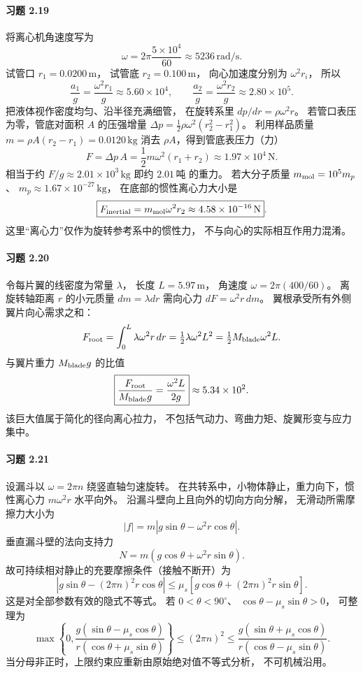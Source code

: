\paragraph{习题 2.19}
将离心机角速度写为
\[
 \omega=2\pi\frac{5\times10^4}{60}
 \approx5236\,\mathrm{rad/s}.
\]
试管口 \(r_1=0.0200\,\mathrm m\)，
试管底 \(r_2=0.100\,\mathrm m\)，
向心加速度分别为 \(\omega^2r_i\)，
所以
\[
 \frac{a_1}{g}=\frac{\omega^2r_1}{g}
 \approx5.60\times10^4,\qquad
 \frac{a_2}{g}=\frac{\omega^2r_2}{g}
 \approx2.80\times10^5.
\]
把液体视作密度均匀、沿半径充满细管，
在旋转系里 \(dp/dr=\rho\omega^2r\)。
若管口表压为零，管底对面积 \(A\) 的压强增量
\(\Delta p=\frac12\rho\omega^2(r_2^2-r_1^2)\)。
利用样品质量
\(m=\rho A(r_2-r_1)=0.0120\,\mathrm{kg}\) 消去
\(\rho A\)，得到管底表压力（力）
\[
 \boxed{F=\Delta p\,A
 =\frac12m\omega^2(r_1+r_2)}
 \approx1.97\times10^4\,\mathrm N.
\]
相当于约 \(F/g\approx2.01\times10^3\,\mathrm{kg}\)
即约 \(\boxed{2.01\,\text{吨}}\) 的重力。
若大分子质量
\(m_{\rm mol}=10^5m_p\)、
\(m_p\approx1.67\times10^{-27}\,\mathrm{kg}\)，
在底部的惯性离心力大小是
\[
 \boxed{F_{\rm inertial}
 =m_{\rm mol}\omega^2r_2
 \approx4.58\times10^{-16}\,\mathrm N}.
\]
这里“离心力”仅作为旋转参考系中的惯性力，
不与向心的实际相互作用力混淆。

\paragraph{习题 2.20}
令每片翼的线密度为常量 \(\lambda\)，
长度 \(L=5.97\,\mathrm m\)，
角速度 \(\omega=2\pi(400/60)\)。
离旋转轴距离 \(r\) 的小元质量
\(dm=\lambda dr\) 需向心力
\(dF=\omega^2r\,dm\)。
翼根承受所有外侧翼片向心需求之和：
\[
 F_{\rm root}
 =\int_0^L\lambda\omega^2r\,dr
 =\tfrac12\lambda\omega^2L^2
 =\tfrac12M_{\rm blade}\omega^2L.
\]
与翼片重力 \(M_{\rm blade}g\) 的比值
\[
 \boxed{\frac{F_{\rm root}}{M_{\rm blade}g}
 =\frac{\omega^2L}{2g}}
 \approx5.34\times10^2.
\]
该巨大值属于简化的径向离心拉力，
不包括气动力、弯曲力矩、旋翼形变与应力集中。

\paragraph{习题 2.21}
设漏斗以 \(\omega=2\pi n\) 绕竖直轴匀速旋转。
在共转系中，小物体静止，重力向下，惯性离心力
\(m\omega^2r\) 水平向外。
沿漏斗壁向上且向外的切向方向分解，
无滑动所需摩擦力大小为
\[
 |f|=m|g\sin\theta-\omega^2r\cos\theta|.
\]
垂直漏斗壁的法向支持力
\[
 N=m(g\cos\theta+\omega^2r\sin\theta).
\]
故可持续相对静止的充要摩擦条件（接触不断开）为
\[
 \boxed{|g\sin\theta-(2\pi n)^2r\cos\theta|
 \le\mu_s[g\cos\theta+(2\pi n)^2r\sin\theta]}.
\]
这是对全部参数有效的隐式不等式。
若 \(0<\theta<90^\circ\)、
\(\cos\theta-\mu_s\sin\theta>0\)，
可整理为
\[
 \max\left\{0,\frac{g(\sin\theta-\mu_s\cos\theta)}
 {r(\cos\theta+\mu_s\sin\theta)}\right\}
 \le(2\pi n)^2\le
 \frac{g(\sin\theta+\mu_s\cos\theta)}
 {r(\cos\theta-\mu_s\sin\theta)}.
\]
当分母非正时，上限约束应重新由原始绝对值不等式分析，
不可机械沿用。

